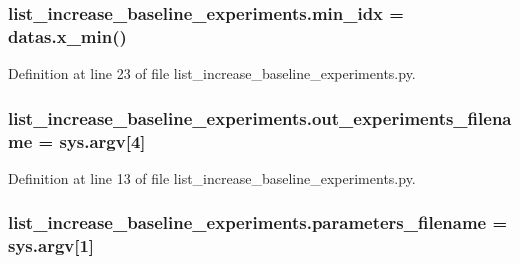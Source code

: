 \subsubsection[{\texorpdfstring{min\+\_\+idx}{min_idx}}]{\setlength{\rightskip}{0pt plus 5cm}list\+\_\+increase\+\_\+baseline\+\_\+experiments.\+min\+\_\+idx = datas.\+x\+\_\+min()}\hypertarget{namespacelist__increase__baseline__experiments_aeab9d1c4828670116525516b4c883fae}{}\label{namespacelist__increase__baseline__experiments_aeab9d1c4828670116525516b4c883fae}


Definition at line 23 of file list\+\_\+increase\+\_\+baseline\+\_\+experiments.\+py.

\subsubsection[{\texorpdfstring{out\+\_\+experiments\+\_\+filename}{out_experiments_filename}}]{\setlength{\rightskip}{0pt plus 5cm}list\+\_\+increase\+\_\+baseline\+\_\+experiments.\+out\+\_\+experiments\+\_\+filename = sys.\+argv\mbox{[}4\mbox{]}}\hypertarget{namespacelist__increase__baseline__experiments_a5899ebc180d88f06ca89b5259654dc93}{}\label{namespacelist__increase__baseline__experiments_a5899ebc180d88f06ca89b5259654dc93}


Definition at line 13 of file list\+\_\+increase\+\_\+baseline\+\_\+experiments.\+py.

\subsubsection[{\texorpdfstring{parameters\+\_\+filename}{parameters_filename}}]{\setlength{\rightskip}{0pt plus 5cm}list\+\_\+increase\+\_\+baseline\+\_\+experiments.\+parameters\+\_\+filename = sys.\+argv\mbox{[}1\mbox{]}}\hypertarget{namespacelist__increase__baseline__experiments_a43bfd35e9474f9414c8c221dbb8b18c9}{}\label{namespacelist__increase__baseline__experiments_a43bfd35e9474f9414c8c221dbb8b18c9}



